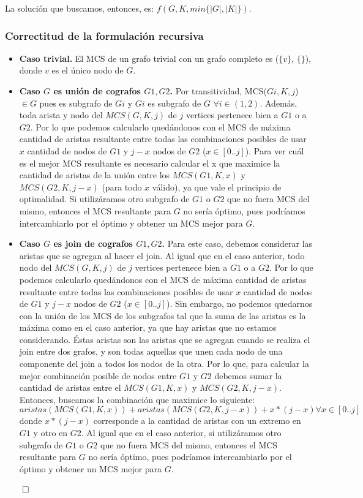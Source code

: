 La solución que buscamos, entonces, es: $f(G, K, min \{|G|, |K|\})$.

\subsubsection{Correctitud de la formulación recursiva}

\begin{itemize}
\item \textbf{Caso trivial.} El MCS de un grafo trivial con un grafo completo es ($\{v\}$, $\{\}$), donde $v$ es el único nodo de $G$.
\item \textbf{Caso $G$ es unión de cografos $G1, G2$.} Por transitividad, MCS($Gi, K, j$) $\in G$ pues es subgrafo de $Gi$ y $Gi$ es subgrafo de $G$ $\forall i \in (1,2)$. Además, toda arista y nodo del $MCS(G,K,j)$ de $j$ vertices pertenece bien a $G1$ o a $G2$. Por lo que podemos calcularlo quedándonos con el MCS de máxima cantidad de aristas resultante entre todas las combinaciones posibles de usar $x$ cantidad de nodos de $G1$ y $j-x$ nodos de $G2$ ($x \in [0..j]$). Para ver cuál es el mejor MCS resultante es necesario calcular el x que maximice la cantidad de aristas de la unión entre los $MCS(G1,K,x)$  y $MCS(G2,K,j-x)$ (para todo $x$ válido), ya que vale el principio de optimalidad. Si utilizáramos otro subgrafo de $G1$ o $G2$ que no fuera MCS del mismo, entonces el MCS resultante para $G$ no sería óptimo, pues podríamos intercambiarlo por el óptimo y obtener un MCS mejor para $G$.
\item \textbf{Caso $G$ es join de cografos $G1, G2$.} Para este caso, debemos considerar las aristas que se agregan al hacer el join. Al igual que en el caso anterior, todo nodo del $MCS(G,K,j)$ de $j$ vertices pertenece bien a $G1$ o a $G2$. Por lo que podemos calcularlo quedándonos con el MCS de máxima cantidad de aristas resultante entre todas las combinaciones posibles de usar $x$ cantidad de nodos de $G1$ y $j-x$ nodos de $G2$ ($x \in [0..j]$). Sin embargo, no podemos quedarnos con la unión de los MCS de los subgrafos tal que la suma de las aristas es la máxima como en el caso anterior, ya que hay aristas que no estamos considerando. Éstas aristas son las aristas que se agregan cuando se realiza el join entre dos grafos, y son todas aquellas que unen cada nodo de una componente del join a todos los nodos de la otra. Por lo que, para calcular la mejor combinación posible de nodos entre $G1$ y $G2$ debemos sumar la cantidad de aristas entre el $MCS(G1,K,x)$  y $MCS(G2,K,j-x)$. Entonces, buscamos la combinación que maximice lo siguiente:
\[ aristas(MCS(G1,K,x)) + aristas(MCS(G2,K,j-x)) + x*(j-x) \forall x \in [0..j] \]
donde $x*(j-x)$ corresponde a la cantidad de aristas con un extremo en $G1$ y otro en $G2$. Al igual que en el caso anterior, si utilizáramos otro subgrafo de $G1$ o $G2$ que no fuera MCS del mismo, entonces el MCS resultante para $G$ no sería óptimo, pues podríamos intercambiarlo por el óptimo y obtener un MCS mejor para $G$.
\end{itemize}
$\qed$

